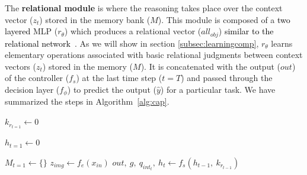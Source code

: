 The \textbf{relational module} is where the reasoning takes place over the context vector ($z_t$) stored in the memory bank ($M$). This module is composed of a \textcolor{black}{two layered} MLP ($r_{\theta}$) which produces a relational vector ($all_{obj}$) \textcolor{black}{similar to the relational network~\citep{santoro2017simple}}. As we will show in section \ref{subsec:learningcomp}, $r_{\theta}$ learns elementary operations associated with basic relational judgments between context vectors ($z_t$) stored in the memory ($M$). It is concatenated with the output ($out$) of the controller ($f_s$) at the last time step ($t=T$) and passed through the decision layer ($f_{\phi}$) to predict the output ($\hat{y}$) for a particular task. We have summarized the steps in Algorithm~\ref{alg:cap}.

\begin{algorithm}[H]
    \caption{Guided Attention Model for (visual) Reasoning (\textit{GAMR}). $LN$ represents layer normalization \citep{ba2016layer} ($||$) indicates the concatenation of two vectors, forming a new vector. \{, \} indicates the concatenation of a matrix and a vector, forming a matrix with one additional row. $\odot$ represents element-wise multiplication and \{. \} represents the product between a scalar and a vector. (h,w) corresponds to the height and width of the feature map obtained from the encoder ($f_e$).}
    \label{alg:cap}

\begin{algorithmic}
    \State \begin{math}{k}_{r_{t=1}} \leftarrow{} 0 \end{math} 
    
    \State \begin{math}{h}_{t=1} \leftarrow{} 0\end{math} 
    
    \State \begin{math}{M}_{t=1} \leftarrow{} \{\}\end{math}
    \State \begin{math}z_{img} \leftarrow{}
    f_e(x_{in})\end{math} 
            \State \begin{math} out,~ g,~ q_{int_t},~ h_t \leftarrow{} f_s(h_{t-1}, ~k_{r_{t-1}}) \end{math}
            

\end{algorithmic}
\end{algorithm}
